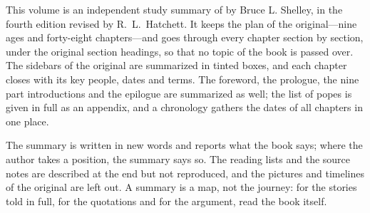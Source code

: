 \thispagestyle{empty}
\vspace*{\fill}
\begingroup\small
\noindent{}\par\vspace{6pt}
\noindent This volume is an independent study summary of  by
Bruce L. Shelley, in the fourth edition revised by R.~L.~Hatchett. It keeps the plan of the original---nine ages and forty-eight chapters---and goes through every chapter section by section, under the
original section headings, so that no topic of the book is passed over. The sidebars of the original are
summarized in tinted boxes, and each chapter closes with its key people, dates and terms. The foreword,
the prologue, the nine part introductions and the epilogue are summarized as well; the list of popes is
given in full as an appendix, and a chronology gathers the dates of all chapters in one place.

\medskip
\noindent The summary is written in new words and reports what the book says; where the author takes a
position, the summary says so. The reading lists and the source notes are described at the end but not
reproduced, and the pictures and timelines of the original are left out. A summary is a map, not the
journey: for the stories told in full, for the quotations and for the argument, read the book itself.
\par\endgroup
\clearpage

